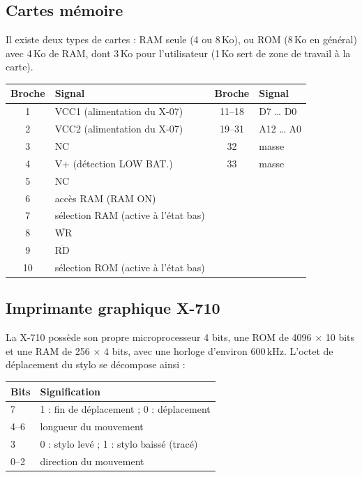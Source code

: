 \documentclass[a4paper,10pt]{article}
\begin{document}
\subsection{Cartes mémoire}
Il existe deux types de cartes : RAM seule (4 ou 8\,Ko), ou ROM (8\,Ko en
général) avec 4\,Ko de RAM, dont 3\,Ko pour l'utilisateur (1\,Ko sert de
zone de travail à la carte).

\begin{center}\small
\begin{tabular}{@{}cl|cl@{}}
\toprule
Broche & Signal & Broche & Signal \\
\midrule
1 & VCC1 (alimentation du X-07) & 11--18 & D7 \dots{} D0 \\
2 & VCC2 (alimentation du X-07) & 19--31 & A12 \dots{} A0 \\
3 & NC & 32 & masse \\
4 & V+ (détection LOW BAT.) & 33 & masse \\
5 & NC & & \\
6 & accès RAM (RAM ON) & & \\
7 & sélection RAM (active à l'état bas) & & \\
8 & $\overline{\mbox{WR}}$ & & \\
9 & $\overline{\mbox{RD}}$ & & \\
10 & sélection ROM (active à l'état bas) & & \\
\bottomrule
\end{tabular}
\end{center}

\subsection{Imprimante graphique X-710}
La X-710 possède son propre microprocesseur 4 bits, une ROM de
4096 $\times$ 10 bits et une RAM de 256 $\times$ 4 bits, avec une horloge
d'environ 600\,kHz. L'octet de déplacement du stylo se décompose ainsi :
\begin{center}\small
\begin{tabular}{@{}ll@{}}
\toprule
Bits & Signification \\
\midrule
7 & 1 : fin de déplacement ; 0 : déplacement \\
4--6 & longueur du mouvement \\
3 & 0 : stylo levé ; 1 : stylo baissé (tracé) \\
0--2 & direction du mouvement \\
\bottomrule
\end{tabular}
\end{center}
\end{document}
